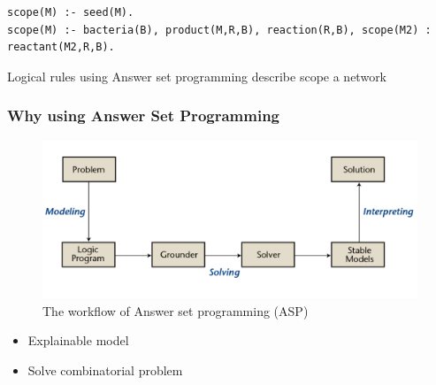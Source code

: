 \documentclass[8pt]{beamer}
\begin{document}
\begin{frame}[fragile]
\begin{onlyenv}
\begin{minipage}{0.5\textwidth}
\end{minipage}%
\begin{minipage}{0.55\textwidth}
\begin{lstlisting}[style=asp]
scope(M) :- seed(M).
scope(M) :- bacteria(B), product(M,R,B), reaction(R,B), scope(M2) : reactant(M2,R,B).
\end{lstlisting}
\end{minipage}

\begin{block}{}
Logical rules using Answer set programming describe scope a network \tiny \citep{Ebenhoh2004}
\end{block}
\end{onlyenv}
\end{frame}

\begin{frame}
\frametitle{Why using Answer Set Programming}
\centering
\begin{figure}[h]
\includegraphics[width=\textwidth]{figures/asp}
\caption{The workflow of Answer set programming (ASP) \tiny \citep{Kaufmann2016GroundingAS}}
\end{figure}
\begin{block}{}
\begin{itemize}
\item Explainable model
\item Solve combinatorial problem
\end{itemize}

\end{block}
\end{frame}
\end{document}
